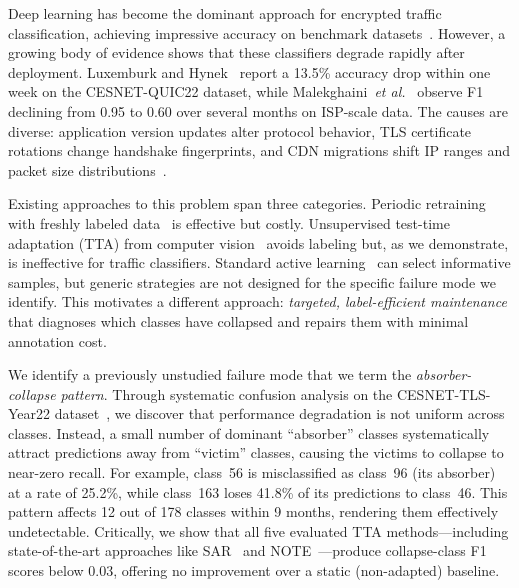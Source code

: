 \documentclass[journal]{IEEEtran}
\makeatletter
\newcommand{\etal}{\textit{et al.}\@}
\makeatother
\begin{document}
Deep learning has become the dominant approach for encrypted traffic classification, achieving impressive accuracy on benchmark datasets~\cite{luxemburk2023quic, lin2022etbert, zhao2023yatc, pacheco2019towards, wang2019survey}.
However, a growing body of evidence shows that these classifiers degrade rapidly after deployment.
Luxemburk and Hynek~\cite{luxemburk2023quic} report a 13.5\% accuracy drop within one week on the CESNET-QUIC22 dataset, while Malekghaini~\etal{}~\cite{malekghaini2023drift} observe F1 declining from 0.95 to 0.60 over several months on ISP-scale data.
The causes are diverse: application version updates alter protocol behavior, TLS certificate rotations change handshake fingerprints, and CDN migrations shift IP ranges and packet size distributions~\cite{soukup2025drift, lu2019learning, gama2014survey}.

Existing approaches to this problem span three categories.
Periodic retraining with freshly labeled data~\cite{chen2025selfevolving} is effective but costly.
Unsupervised test-time adaptation (TTA) from computer vision~\cite{wang2021tent, niu2022eata, niu2023sar} avoids labeling but, as we demonstrate, is ineffective for traffic classifiers.
Standard active learning~\cite{settles2009active, sener2018coreset, ash2020badge} can select informative samples, but generic strategies are not designed for the specific failure mode we identify.
This motivates a different approach: \textit{targeted, label-efficient maintenance} that diagnoses which classes have collapsed and repairs them with minimal annotation cost.

We identify a previously unstudied failure mode that we term the \textit{absorber-collapse pattern}.
Through systematic confusion analysis on the CESNET-TLS-Year22 dataset~\cite{hynek2024cesnet}, we discover that performance degradation is not uniform across classes.
Instead, a small number of dominant ``absorber'' classes systematically attract predictions away from ``victim'' classes, causing the victims to collapse to near-zero recall.
For example, class~56 is misclassified as class~96 (its absorber) at a rate of 25.2\%, while class~163 loses 41.8\% of its predictions to class~46.
This pattern affects 12 out of 178 classes within 9 months, rendering them effectively undetectable.
Critically, we show that all five evaluated TTA methods---including state-of-the-art approaches like SAR~\cite{niu2023sar} and NOTE~\cite{gong2022note}---produce collapse-class F1 scores below 0.03, offering no improvement over a static (non-adapted) baseline.
\end{document}

